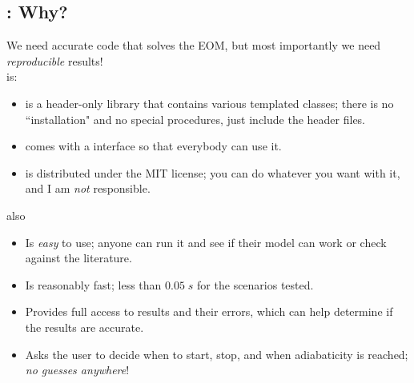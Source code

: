 \documentclass[10pt,utf8,compress,xcolor=dvipsnames]{beamer}
\begin{document}
\subsection{\mimes: Why?}
\begin{frame}{\insertsubsectionhead}
	We need accurate code that solves the EOM, but most importantly we need {\sl reproducible} results! \\[0.5cm]
	
	\mimes is:
	\begin{itemize}
		\item \mimes is a \CPP header-only library that contains various templated classes; there is no ``installation" and no special procedures, just include the header files. 
		\item \mimes comes with a \PY interface so that everybody can use it.
		\item \mimes is distributed under the MIT license; you can do whatever you want with it, and I am {\em not} responsible.\\[0.1cm]
	\end{itemize}
	
	\mimes also
	\begin{itemize}
		\item Is {\sl easy} to use; anyone can run it and see if their model can work or check against the literature.
		\item Is reasonably fast; less than $0.05 \; s$ for the scenarios tested.
		\item Provides full access to results and their errors, which can help determine if the results are accurate.
		\item Asks the user to decide when to start, stop, and when adiabaticity is reached; {\em no guesses anywhere}! 
	\end{itemize}
	
	
	
\end{frame}
\end{document}
